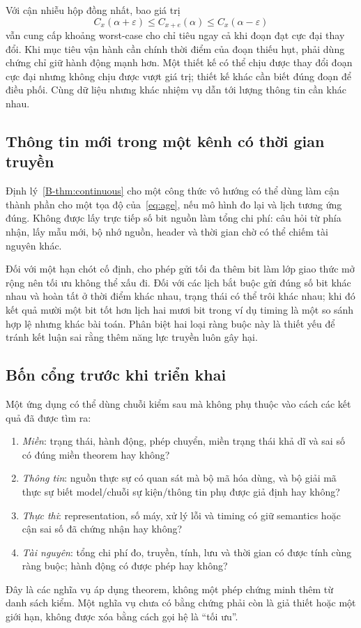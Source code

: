 Với cận nhiễu hộp đồng nhất, bao giá trị
\[
C_x(\alpha+\varepsilon)\le C_{x+e}(\alpha)\le C_x(\alpha-\varepsilon)
\]
vẫn cung cấp khoảng worst-case cho chỉ tiêu ngay cả khi đoạn đạt cực đại thay đổi. Khi mục tiêu vận hành cần chính thời điểm của đoạn thiếu hụt, phải dùng chứng chỉ giữ hành động mạnh hơn. Một thiết kế có thể chịu được thay đổi đoạn cực đại nhưng không chịu được vượt giá trị; thiết kế khác cần biết đúng đoạn để điều phối. Cùng dữ liệu nhưng khác nhiệm vụ dẫn tới lượng thông tin cần khác nhau.

\subsection{Thông tin mới trong một kênh có thời gian truyền}
Định lý~\ref{B-thm:continuous} cho một công thức vô hướng có thể dùng làm cận thành phần cho một tọa độ của~\eqref{eq:age}, nếu mô hình đo lại và lịch tương ứng đúng. Không được lấy trực tiếp số bit nguồn làm tổng chi phí: câu hỏi từ phía nhận, lấy mẫu mới, bộ nhớ nguồn, header và thời gian chờ có thể chiếm tài nguyên khác.

Đối với một hạn chót cố định, cho phép gửi tối đa thêm bit làm lớp giao thức mở rộng nên tối ưu không thể xấu đi. Đối với các lịch bắt buộc gửi đúng số bit khác nhau và hoàn tất ở thời điểm khác nhau, trạng thái có thể trôi khác nhau; khi đó kết quả mười một bit tốt hơn lịch hai mươi bit trong ví dụ timing là một so sánh hợp lệ nhưng khác bài toán. Phân biệt hai loại ràng buộc này là thiết yếu để tránh kết luận sai rằng thêm năng lực truyền luôn gây hại.

\subsection{Bốn cổng trước khi triển khai}
Một ứng dụng có thể dùng chuỗi kiểm sau mà không phụ thuộc vào cách các kết quả đã được tìm ra:
\begin{enumerate}
\item \emph{Miền}: trạng thái, hành động, phép chuyển, miền trạng thái khả dĩ và sai số có đúng miền theorem hay không?
\item \emph{Thông tin}: nguồn thực sự có quan sát mà bộ mã hóa dùng, và bộ giải mã thực sự biết model/chuỗi sự kiện/thông tin phụ được giả định hay không?
\item \emph{Thực thi}: representation, số máy, xử lý lỗi và timing có giữ semantics hoặc cận sai số đã chứng nhận hay không?
\item \emph{Tài nguyên}: tổng chi phí đo, truyền, tính, lưu và thời gian có được tính cùng ràng buộc; hành động có được phép hay không?
\end{enumerate}
Đây là các nghĩa vụ áp dụng theorem, không một phép chứng minh thêm từ danh sách kiểm. Một nghĩa vụ chưa có bằng chứng phải còn là giả thiết hoặc một giới hạn, không được xóa bằng cách gọi hệ là ``tối ưu''.
